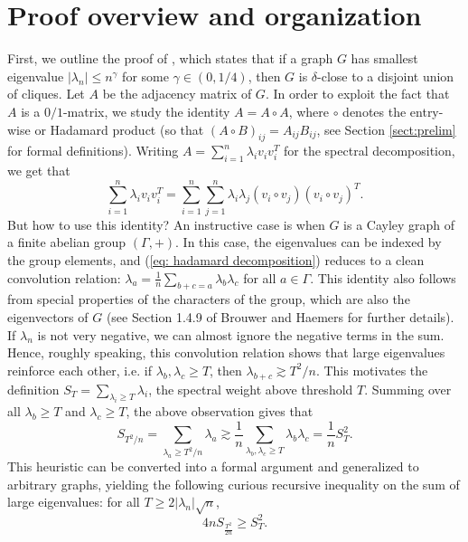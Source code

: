 \documentclass[11pt]{article}
\theoremstyle{plain}
\theoremstyle{definition}
\begin{document}
\section{Proof overview and organization}

First, we outline the proof of , which states that if a graph $G$ has smallest eigenvalue $|\lambda_n|\leq n^{\gamma}$ for some $\gamma\in (0, 1/4)$, then $G$ is $\delta$-close to a disjoint union of cliques. Let $A$ be the adjacency matrix of $G$. 
In order to exploit the fact that $A$ is a $0/1$-matrix, we study the identity $A=A\circ A$, where $\circ$ denotes the entry-wise or Hadamard product (so that $(A\circ B)_{ij}=A_{ij}B_{ij}$, see Section \ref{sect:prelim} for formal definitions). Writing $A=\sum_{i=1}^n \lambda_i v_iv_i^T$ for the spectral decomposition, we get that 
\begin{equation}\label{eq: hadamard decomposition}
    \sum_{i=1}^n \lambda_i v_iv_i^T=\sum_{i=1}^n\sum_{j=1}^n \lambda_i\lambda_j (v_i\circ v_j)(v_i\circ v_j)^T.
\end{equation}
But how to use this identity? An instructive case is when $G$ is a Cayley graph of a finite abelian group $(\Gamma,+)$. In this case, the eigenvalues can be indexed by the group elements, and (\ref{eq: hadamard decomposition}) reduces to a clean convolution relation: $\lambda_a = \frac{1}{n}\sum_{b+c=a} \lambda_b\lambda_c$ for all $a \in \Gamma$. 
This identity also follows from special properties of the characters of the group, which are also the eigenvectors of $G$ (see Section 1.4.9 of Brouwer and Haemers \cite{BH12} for further details). 
If $\lambda_n$ is not very negative, we can almost ignore the negative terms in the sum. Hence, roughly speaking, this convolution relation shows that large eigenvalues reinforce each other, i.e. if $\lambda_b,\lambda_c \ge T$, then $\lambda_{b+c} \gtrsim T^2/n$. 
This motivates the definition $S_T=\sum_{\lambda_i\ge T}\lambda_i$, the spectral weight above threshold $T$. 
Summing over all $\lambda_b\ge T$ and $\lambda_c \ge T$, the above observation gives that $$S_{T^2/n} = \sum_{\lambda_a \ge T^2/n} \lambda_a\gtrsim \frac{1}{n}\sum_{\lambda_b,\lambda_c \ge T}\lambda_b\lambda_c = \frac{1}{n}S_T^2 .$$
This heuristic can be converted into a formal argument and generalized to arbitrary graphs, yielding the following curious recursive inequality on the sum of large eigenvalues: for all $T \ge 2|\lambda_n|\sqrt{n}$,
\begin{equation}\label{eq:recursion}
    4nS_{\frac{T^2}{2n}}\geq S_T^2.
\end{equation}
\end{document}
